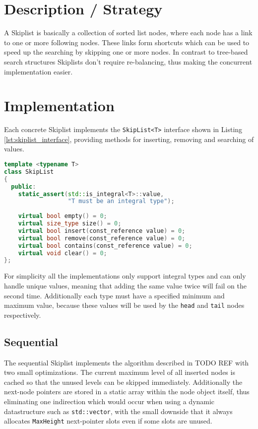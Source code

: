 
\section{Description / Strategy}

A Skiplist is basically a collection of sorted list nodes, where each node has a link to one or more following nodes. These links form shortcuts which can be used to speed up the searching by skipping one or more nodes. In contrast to tree-based search structures Skiplists don't require re-balancing, thus making the concurrent implementation easier.




\section{Implementation}

Each concrete Skiplist implements the \texttt{SkipList<T>} interface shown in Listing \ref{lst:skiplist_interface}, providing methods for inserting, removing and searching of values.

\begin{lstlisting}[language=C++, caption={Skiplist Interface}, label=lst:skiplist_interface]
template <typename T>
class SkipList
{
  public:
    static_assert(std::is_integral<T>::value, 
                  "T must be an integral type");
    
    virtual bool empty() = 0;
    virtual size_type size() = 0;
    virtual bool insert(const_reference value) = 0;
    virtual bool remove(const_reference value) = 0;
    virtual bool contains(const_reference value) = 0;
    virtual void clear() = 0;
};
\end{lstlisting}
\noindent For simplicity all the implementations only support integral types and can only handle unique values, meaning that adding the same value twice will fail on the second time. Additionally each type must have a specified minimum and maximum value, because these values will be used by the \texttt{head} and \texttt{tail} nodes respectively. 



\subsection{Sequential}
The sequential Skiplist implements the algorithm described in TODO REF with two small optimizations. The current maximum level of all inserted nodes is cached so that the unused levels can be skipped immediately. Additionally the next-node pointers are stored in a static array within the node object itself, thus eliminating one indirection which would occur when using a dynamic datastructure such as \texttt{std::vector}, with the small downside that it always allocates \texttt{MaxHeight} next-pointer slots even if some slots are unused.

